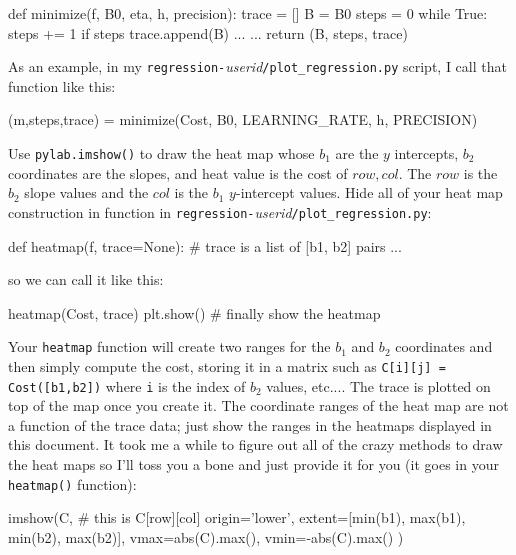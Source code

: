 \documentclass[titlepage]{tufte-book}
\begin{document}
\begin{fullwidth}
\begin{pyverbatim}
def minimize(f, B0, eta, h, precision):
    trace = []
    B = B0
    steps = 0 
    while True:
        steps += 1
        if steps %
            trace.append(B)
        ...     
    ... 
    return (B, steps, trace)
\end{pyverbatim}

\noindent As an example, in my {\tt regression-}{\em userid}{\tt /plot\_regression.py} script, I call that function like this:

\begin{pyverbatim}
(m,steps,trace) = minimize(Cost, B0, LEARNING_RATE, h, PRECISION)
\end{pyverbatim}

Use {\tt pylab.imshow()} to draw the heat map whose $b_1$ are the $y$ intercepts, $b_2$ coordinates are the slopes, and heat value is the cost of $row,col$. The $row$ is the $b_2$ slope values and the $col$ is the $b_1$ $y$-intercept values. Hide all of your heat map construction in function in {\tt regression-}{\em userid}{\tt /plot\_regression.py}:

\begin{pyverbatim}
def heatmap(f, trace=None): # trace is a list of [b1, b2] pairs
    ...
\end{pyverbatim}

\noindent so we can call it like this:

\begin{pyverbatim}
heatmap(Cost, trace)
plt.show() # finally show the heatmap
\end{pyverbatim}

Your {\tt heatmap} function will create two ranges for the $b_1$ and $b_2$ coordinates and then simply compute the cost, storing it in a matrix such as {\tt C[i][j] = Cost([b1,b2])} where {\tt i} is the index of $b_2$ values, etc....  The trace is plotted on top of the map once you create it. The coordinate ranges of the heat map are not a function of the trace data; just show the ranges in the heatmaps displayed in this document. It took me a while to figure out all of the crazy methods to draw the heat maps so I'll toss you a bone and just provide it for you (it goes in your {\tt heatmap()} function):

\begin{pyverbatim}
	imshow(C,  # this is C[row][col]
		   origin='lower',
		   extent=[min(b1), max(b1), min(b2), max(b2)],
		   vmax=abs(C).max(), vmin=-abs(C).max()
	)
\end{pyverbatim}


\end{fullwidth}
\end{document}
